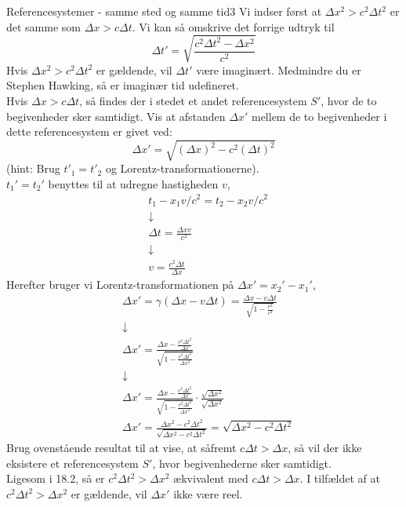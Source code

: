 \documentclass[crop=false, class=memoir]{standalone}
\begin{document}
\begin{opgave}{Referencesystemer - samme sted og samme tid}{3}
	Vi indser først at $\Delta x^2 > c^2\Delta t^2$ er det samme som $\Delta x > c\Delta t$. Vi kan så omskrive det forrige udtryk til
	$$\Delta t'=\sqrt{\frac{c^2\Delta t^2-\Delta x^2}{c^2}}$$
	Hvis $\Delta x^2 > c^2\Delta t^2$ er gældende, vil $\Delta t'$ være imaginært. Medmindre du er Stephen Hawking, så er imaginær tid udefineret.\\
	\opg Hvis $\Delta x > c \Delta t$, så findes der i stedet et andet referencesystem $S'$, hvor de to begivenheder sker samtidigt. Vis at afstanden $\Delta x'$ mellem de to begivenheder i dette referencesystem er givet ved:
	$$\Delta x' = \sqrt{\left( \Delta x \right)^2 - c^2 \left( \Delta t \right)^2}$$
	(hint: Brug $t'_1 = t'_2$ og Lorentz-transformationerne).\\
	
	$t_1'=t_2'$ benyttes til at udregne hastigheden $v$,
	\begin{align*}
	&t_1-x_1v/c^2=t_2-x_2v/c^2 \\
	&\downarrow \\
	&\Delta t=\frac{\Delta x v}{c^2} \\
	&\downarrow \\
	&v=\frac{c^2\Delta t}{\Delta x}
	\end{align*}
	Herefter bruger vi Lorentz-transformationen på $\Delta x'= x_2'-x_1'$,
	\begin{align*}
	&\Delta x'=\gamma(\Delta x-v\Delta t)=\frac{\Delta x-v\Delta t}{\sqrt{1-\frac{v^2}{c^2}}} \\
	&\downarrow \\
	&\Delta x'=\frac{\Delta x-\frac{c^2\Delta t^2}{\Delta x}}{\sqrt{1-\frac{c^2\Delta t^2}{\Delta x^2}}} \\
	&\downarrow \\
	&\Delta x'=\frac{\Delta x-\frac{c^2\Delta t^2}{\Delta x}}{\sqrt{1-\frac{c^2\Delta t^2}{\Delta x^2}}} \cdot \frac{\sqrt{\Delta x^2}}{\sqrt{\Delta x^2}} \\
	&\Delta x'=\frac{\Delta x^2-c^2\Delta t^2}{\sqrt{\Delta x^2-c^2\Delta t^2}} = \sqrt{\Delta x^2-c^2\Delta t^2}
	\end{align*}
	\opg Brug ovenstående resultat til at vise, at såfremt $c \Delta t > \Delta x$, så vil der ikke eksistere et referencesystem $S'$, hvor begivenhederne sker samtidigt.\\
	
		Ligesom i 18.2, så er $c^2\Delta t^2 > \Delta x^2$ ækvivalent med $c\Delta t > \Delta x$. I tilfældet af at $c^2\Delta t^2 > \Delta x^2$ er gældende, vil $\Delta x'$ ikke være reel.
\end{opgave}
\end{document}

